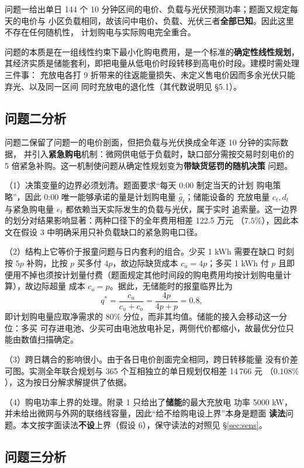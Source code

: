 \documentclass[withoutpreface]{cumcmthesis}
\renewcommand{\emph}[1]{\textbf{#1}}
\begin{document}
问题一给出单日 144 个 10 分钟区间的电价、负载与光伏预测功率；题面又规定每天的电价与
小区负载相同，故该问中电价、负载、光伏三者\emph{全部已知}。因此这里不存在任何随机性，
计划购电与实际购电完全重合。

问题的本质是在一组线性约束下最小化购电费用，是一个标准的\emph{确定性线性规划}，
其经济实质是储能套利，即把电量从低电价时段转移到高电价时段。建模时需处理三件事：
充放电各打 9 折带来的往返能量损失、未定义售电价因而多余光伏只能弃光、以及同一区间
同时充放电的退化性（其代数说明见 \S5.1）。

\subsection{问题二分析}

问题二保留了问题一的电价剖面，但把负载与光伏换成全年逐 10 分钟的实际数据，
并引入\emph{紧急购电}机制：微网供电低于负载时，缺口部分需按交易时刻电价的
5 倍紧急补购。这一机制使问题从确定性规划变为\emph{带缺货惩罚的随机决策}
问题。

\noindent（1）决策变量的边界必须划清。题面要求“每天 0:00 制定当天的计划
购电策略”，因此 0:00 唯一能够承诺的量是计划购电量 $\hat g_t$；储能设备的
充放电量 $c_t,d_t$ 与紧急购电量 $e_t$ 都依赖当天实际发生的负载与光伏，属于实时
追索量。这一边界的划分对结果影响显著：两种口径下的全年费用相差 122.5 万元
（$7.5\%$），因此本文在假设 3 中明确采用只补负载缺口的紧急购电口径。

\noindent（2）结构上它等价于报童问题与日内套利的组合。少买 1 kWh 需要在缺口
时刻按 $5p$ 补购，比按 $p$ 买多付 $4p$，故边际缺货成本 $c_u=4p$；多买 1 kWh 付 $p$
且即便用不掉也须按计划量付费（题面规定其他时间段的购电费用均按计划购电量计算），故边际超量
成本 $c_o=p$。据此，无储能时的报童临界比为
\[
q^*=\frac{c_u}{c_u+c_o}=\frac{4p}{4p+p}=0.8 ,
\]
即计划购电量应取净需求的 $80\%$ 分位，而非其均值。储能的接入会移动这一分位：多买
可存进电池、少买可由电池放电补足，两侧代价都缩小，故最优分位只能由数值扫描确定。

\noindent（3）跨日耦合的影响很小。由于各日电价剖面完全相同，跨日转移能量
没有价差可图。实测全年联合规划与 365 个互相独立的单日规划仅相差 14\,766 元
（$0.108\%$），这为按日分解求解提供了依据。

\noindent（4）购电功率上界的处理。附录 1 只给出了\emph{储能}的最大充放电
功率 5000 kW，并未给出微网与外网的联络线容量，因此“给不给购电设上界”本身是题面
\emph{读法}问题。本文按字面读法\emph{不设}上界（假设 6），保守读法的对照见
\S\ref{sec:sens}。

\subsection{问题三分析}
\end{document}
